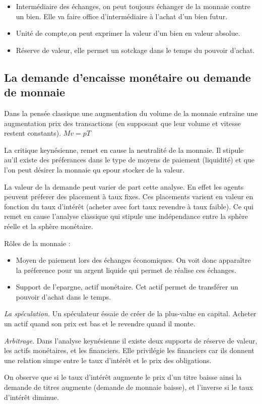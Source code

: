 \begin{itemize}[label=]
	\item Intermédiaire des échanges, on peut toujours échanger de la monnaie contre un bien. Elle va faire office d'intermédiaire à l'achat d'un bien futur.
	\item Unité de compte,on peut exprimer la valeur d'un bien en valeur absolue.
	\item Réserve de valeur, elle permet un sotckage dans le temps du pouvoir d'achat.
\end{itemize}


\subsection{La demande d'encaisse monétaire ou demande de monnaie} %
\label{sub:la_demande_d_encaisse_monetaire_ou_demande_de_monnaie}
Dans la pensée classique une augmentation du volume de la monnaie entraine une augmentation prix des transactions (en supposant que leur volume et vitesse restent constants). $Mv=pT$

La critique keynésienne, remet en cause la neutralité de la monnaie. Il stipule au'il existe des préferances dans le type de moyens de paiement (liquidité)
et que l'on peut désirer la monnaie qu epour stocker de  la valeur.

La valeur de la demande peut varier de part cette analyse. En effet les agents peuvent préferer des placement à taux fixes. Ces placements varient en valeur
en fonction du taux d'intérêt (acheter avec fort taux revendre à taux faible). Ce qui remet en cause l'analyse classique qui stipule une indépendance entre 
la sphère réelle et la sphère monétaire.

\begin{tcolorbox}[title=La demande de monnaie dans une économie keynésienne simplifiée]
	Rôles de la monnaie : 
	\begin{itemize}
		\item Moyen de paiement lors des échanges économiques. On voit donc apparaître la préference pour un argent liquide qui permet de réalise ces échanges.
		\item Support de l'epargne, actif monétaire. Cet actif permet de transférer un pouvoir d'achat dans le temps.
	\end{itemize}

\emph{La spéculation.} Un spéculateur éssaie de créer de la plus-value en capital. Acheter un actif quand son prix est bas et le revendre quand il monte.

\emph{Arbitrage}. Dans l'analyse keynésienne il existe deux supports de réserve de valeur, les actifs monétaires, et les financiers. Elle privilégie les 
financiers car ils donnent une relation simpe entre le taux d'intérêt et le prix des obligations. 

On observe que si le taux d'intérêt augmente le prix d'un titre baisse ainsi la demande de titres augmente (demande de monnaie baisse), et l'inverse si le taux
d'intérêt diminue.
	
\end{tcolorbox}

